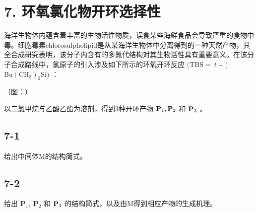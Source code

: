 \section*{7. 环氧氯化物开环选择性}
海洋⽣物体内蕴含着丰富的⽣物活性物质，误⻝某些海鲜⻝品会导致严重的⻝物中毒。细胞毒素chlorosulpholipid是从某海洋⽣物体中分离得到的⼀种天然产物，其全合成研究表明，该分⼦内含有的多氯代结构对其⽣物活性具有重要意义。在该分⼦合成路线中，氯原⼦的引⼊涉及如下所⽰的环氧开环反应 $\mathrm { ( T B S = } ~ t - \mathrm { ) }$ $\mathrm { B u ( C H _ { 3 } ) _ { 2 } S i ) }$ ：

（图：）

以⼆氯甲烷与⼄酸⼄酯为溶剂，得到3种开环产物 $\mathrm { \bf P } _ { 1 } , \mathrm { \bf P } _ { 2 }$ 和 ${ \bf P } _ { 3 }$ 。

\subsection*{7-1}
给出中间体M的结构简式。

\subsection*{7-2}
给出 $\mathbf { P } _ { 1 } , \ \mathbf { P } _ { 2 }$ 和 ${ \bf P } _ { 3 }$ 的结构简式，以及由M得到相应产物的⽣成机理。
